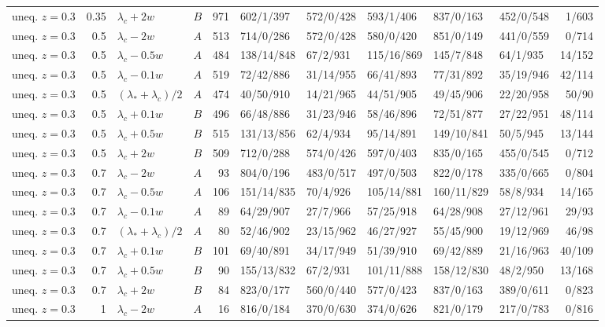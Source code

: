 \begin{longtable}{@{}lrllrlllllr@{}}
uneq. $z{=}0.3$ & 0.35 & $\lambda_c+2w$ & $B$ & 971 & 602/1/397 & 572/0/428 & 593/1/406 & 837/0/163 & 452/0/548 & 1/603\\
uneq. $z{=}0.3$ & 0.5 & $\lambda_c-2w$ & $A$ & 513 & 714/0/286 & 572/0/428 & 580/0/420 & 851/0/149 & 441/0/559 & 0/714\\
uneq. $z{=}0.3$ & 0.5 & $\lambda_c-0.5w$ & $A$ & 484 & 138/14/848 & 67/2/931 & 115/16/869 & 145/7/848 & 64/1/935 & 14/152\\
uneq. $z{=}0.3$ & 0.5 & $\lambda_c-0.1w$ & $A$ & 519 & 72/42/886 & 31/14/955 & 66/41/893 & 77/31/892 & 35/19/946 & 42/114\\
uneq. $z{=}0.3$ & 0.5 & $(\lambda_*+\lambda_c)/2$ & $A$ & 474 & 40/50/910 & 14/21/965 & 44/51/905 & 49/45/906 & 22/20/958 & 50/90\\
uneq. $z{=}0.3$ & 0.5 & $\lambda_c+0.1w$ & $B$ & 496 & 66/48/886 & 31/23/946 & 58/46/896 & 72/51/877 & 27/22/951 & 48/114\\
uneq. $z{=}0.3$ & 0.5 & $\lambda_c+0.5w$ & $B$ & 515 & 131/13/856 & 62/4/934 & 95/14/891 & 149/10/841 & 50/5/945 & 13/144\\
uneq. $z{=}0.3$ & 0.5 & $\lambda_c+2w$ & $B$ & 509 & 712/0/288 & 574/0/426 & 597/0/403 & 835/0/165 & 455/0/545 & 0/712\\
uneq. $z{=}0.3$ & 0.7 & $\lambda_c-2w$ & $A$ & 93 & 804/0/196 & 483/0/517 & 497/0/503 & 822/0/178 & 335/0/665 & 0/804\\
uneq. $z{=}0.3$ & 0.7 & $\lambda_c-0.5w$ & $A$ & 106 & 151/14/835 & 70/4/926 & 105/14/881 & 160/11/829 & 58/8/934 & 14/165\\
uneq. $z{=}0.3$ & 0.7 & $\lambda_c-0.1w$ & $A$ & 89 & 64/29/907 & 27/7/966 & 57/25/918 & 64/28/908 & 27/12/961 & 29/93\\
uneq. $z{=}0.3$ & 0.7 & $(\lambda_*+\lambda_c)/2$ & $A$ & 80 & 52/46/902 & 23/15/962 & 46/27/927 & 55/45/900 & 19/12/969 & 46/98\\
uneq. $z{=}0.3$ & 0.7 & $\lambda_c+0.1w$ & $B$ & 101 & 69/40/891 & 34/17/949 & 51/39/910 & 69/42/889 & 21/16/963 & 40/109\\
uneq. $z{=}0.3$ & 0.7 & $\lambda_c+0.5w$ & $B$ & 90 & 155/13/832 & 67/2/931 & 101/11/888 & 158/12/830 & 48/2/950 & 13/168\\
uneq. $z{=}0.3$ & 0.7 & $\lambda_c+2w$ & $B$ & 84 & 823/0/177 & 560/0/440 & 577/0/423 & 837/0/163 & 389/0/611 & 0/823\\
uneq. $z{=}0.3$ & 1 & $\lambda_c-2w$ & $A$ & 16 & 816/0/184 & 370/0/630 & 374/0/626 & 821/0/179 & 217/0/783 & 0/816\\

\end{longtable}
